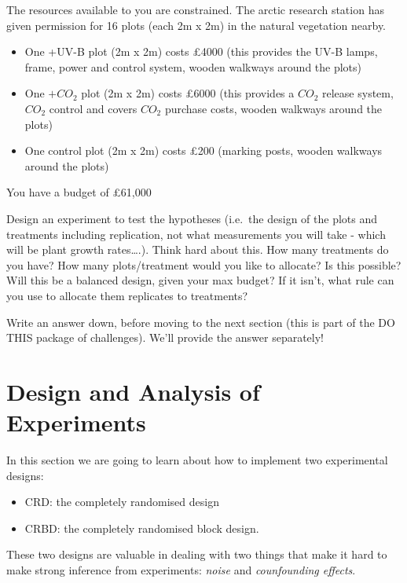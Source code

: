 \documentclass[
]{book}
\providecommand{\tightlist}{%
  \setlength{\itemsep}{0pt}\setlength{\parskip}{0pt}}
\begin{document}
The resources available to you are constrained. The arctic research station has given permission for 16 plots (each 2m x 2m) in the natural vegetation nearby.

\begin{itemize}
\tightlist
\item
  One +UV-B plot (2m x 2m) costs £4000 (this provides the UV-B lamps, frame, power and control system, wooden walkways around the plots)
\item
  One \(+CO_{2}\) plot (2m x 2m) costs £6000 (this provides a \(CO_{2}\) release system, \(CO_{2}\) control and covers \(CO_{2}\) purchase costs, wooden walkways around the plots)
\item
  One control plot (2m x 2m) costs £200 (marking posts, wooden walkways around the plots)
\end{itemize}

You have a budget of £61,000

Design an experiment to test the hypotheses (i.e.~the design of the plots and treatments including replication, not what measurements you will take - which will be plant growth rates\ldots.). Think hard about this. How many treatments do you have? How many plots/treatment would you like to allocate? Is this possible? Will this be a balanced design, given your max budget? If it isn't, what rule can you use to allocate them replicates to treatments?

Write an answer down, before moving to the next section (this is part of the DO THIS package of challenges). We'll provide the answer separately!

\hypertarget{design-and-analysis-of-experiments}{%
\chapter{Design and Analysis of Experiments}\label{design-and-analysis-of-experiments}}

In this section we are going to learn about how to implement two experimental designs:

\begin{itemize}
\tightlist
\item
  CRD: the completely randomised design
\item
  CRBD: the completely randomised block design.
\end{itemize}

These two designs are valuable in dealing with two things that make it hard to make strong inference from experiments: \emph{noise} and \emph{counfounding effects}.
\end{document}
